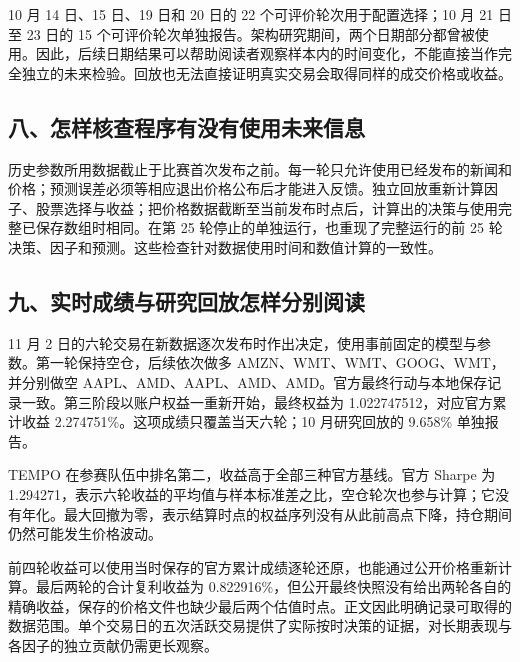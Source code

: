 \documentclass[conference]{IEEEtran}
\begin{document}
10 月 14 日、15 日、19 日和 20 日的 22 个可评价轮次用于配置选择；10 月 21 日至 23 日的 15 个可评价轮次单独报告。架构研究期间，两个日期部分都曾被使用。因此，后续日期结果可以帮助阅读者观察样本内的时间变化，不能直接当作完全独立的未来检验。回放也无法直接证明真实交易会取得同样的成交价格或收益。

\subsection*{八、怎样核查程序有没有使用未来信息}
历史参数所用数据截止于比赛首次发布之前。每一轮只允许使用已经发布的新闻和价格；预测误差必须等相应退出价格公布后才能进入反馈。独立回放重新计算因子、股票选择与收益；把价格数据截断至当前发布时点后，计算出的决策与使用完整已保存数组时相同。在第 25 轮停止的单独运行，也重现了完整运行的前 25 轮决策、因子和预测。这些检查针对数据使用时间和数值计算的一致性。

\subsection*{九、实时成绩与研究回放怎样分别阅读}
11 月 2 日的六轮交易在新数据逐次发布时作出决定，使用事前固定的模型与参数。第一轮保持空仓，后续依次做多 AMZN、WMT、WMT、GOOG、WMT，并分别做空 AAPL、AMD、AAPL、AMD、AMD。官方最终行动与本地保存记录一致。第三阶段以账户权益一重新开始，最终权益为 1.022747512，对应官方累计收益 2.274751\%。这项成绩只覆盖当天六轮；10 月研究回放的 9.658\% 单独报告。

TEMPO 在参赛队伍中排名第二，收益高于全部三种官方基线。官方 Sharpe 为 1.294271，表示六轮收益的平均值与样本标准差之比，空仓轮次也参与计算；它没有年化。最大回撤为零，表示结算时点的权益序列没有从此前高点下降，持仓期间仍然可能发生价格波动。

前四轮收益可以使用当时保存的官方累计成绩逐轮还原，也能通过公开价格重新计算。最后两轮的合计复利收益为 0.822916\%，但公开最终快照没有给出两轮各自的精确收益，保存的价格文件也缺少最后两个估值时点。正文因此明确记录可取得的数据范围。单个交易日的五次活跃交易提供了实际按时决策的证据，对长期表现与各因子的独立贡献仍需更长观察。
\end{document}
